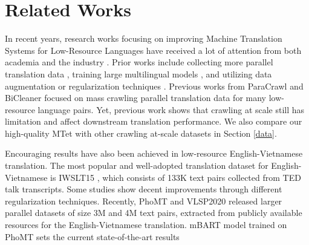 \documentclass[11pt]{article}
\begin{document}
 
\section{Related Works}
In recent years, research works focusing on improving Machine Translation Systems for Low-Resource Languages have received a lot of attention from both academia and the industry \cite{fbwat19, souretargetmismatch, gu-etal-2018-universal, zulu}. Prior works include collecting more parallel translation data \cite{alt, paracrawl, bicleaner}, training large multilingual models \cite{m2m100, mbart}, and utilizing data augmentation or regularization techniques \cite{selftraining, backtranslateatscale, bpedrop}. Previous works from ParaCrawl \cite{paracrawl} and BiCleaner \cite{bicleaner} focused on mass crawling parallel translation data for many low-resource language pairs. Yet, previous work \cite{phomt} shows that crawling at scale still has limitation and affect downstream translation performance. We also compare our high-quality MTet with other crawling at-scale datasets in Section \ref{data}. 


Encouraging results have also been achieved in low-resource English-Vietnamese translation. The most popular and well-adopted translation dataset for English-Vietnamese is IWSLT15 \cite{cettolo-etal-2015-iwslt}, which consists of 133K text pairs collected from TED talk transcripts. Some studies \cite{provilkov-etal-2020-bpe, 10.5555/3454287.3454681, nguyen-salazar-2019-transformers} show decent improvements through different regularization techniques. Recently, PhoMT \cite{phomt} and VLSP2020 \cite{vlsp2020-mt} released larger parallel datasets of size 3M and 4M text pairs, extracted from publicly available resources for the English-Vietnamese translation. mBART model trained on PhoMT sets the current state-of-the-art results
\end{document}
